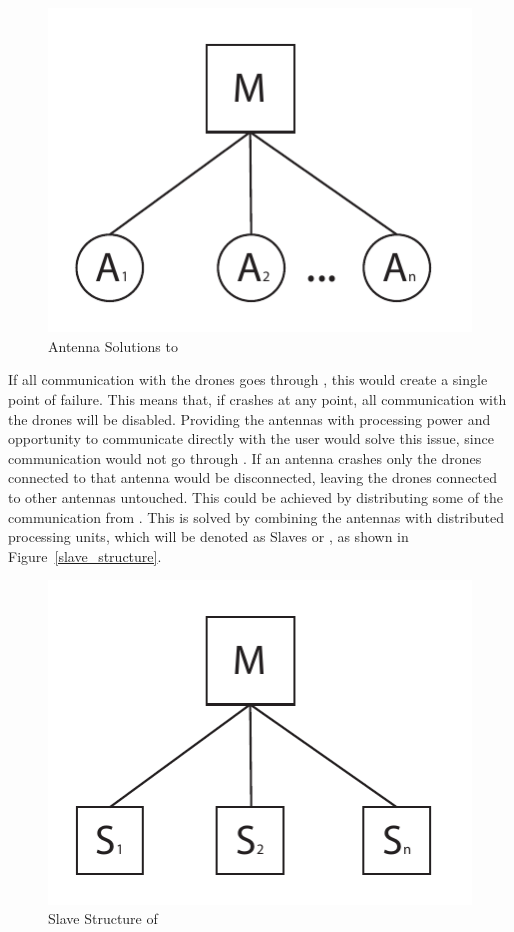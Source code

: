 \begin{figure}[htb]
    \centering
    \includegraphics[width=\textwidth]{gfx/antenna_structure.pdf}
    \caption{Antenna Solutions to \projectname{}}
    \label{fig:antenna_solutions}
\end{figure}

If all communication with the drones goes through , this would create a single point of failure. This means that, if  crashes at any point, all communication with the drones will be disabled. Providing the antennas with processing power and opportunity to communicate directly with the user would solve this issue, since communication would not go through . If an antenna crashes only the drones connected to that antenna would be disconnected, leaving the drones connected to other antennas untouched. This could be achieved by distributing some of the communication from . This is solved by combining the antennas with distributed processing units, which will be denoted as Slaves or , as shown in Figure~\ref{slave_structure}.

\begin{figure}[htb]
    \centering
    \includegraphics[width=\textwidth]{gfx/slave_structure.pdf}
    \caption{Slave Structure of \projectname{}}
    \label{fig:slave_structure}
\end{figure}

